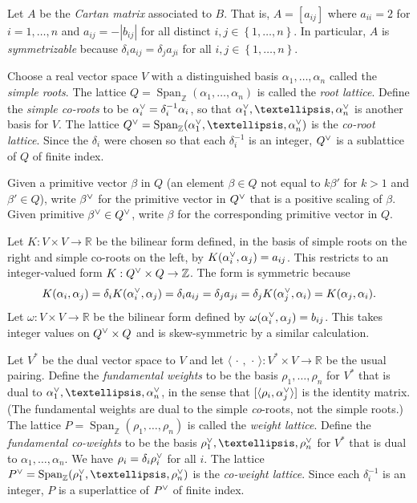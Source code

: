 \documentclass[10pt,a4paper]{amsart}
\theoremstyle{definition}
\DeclareMathOperator{\Span}{Span}
\newcommand{\newword}[1]{\emph{#1}}
\newcommand{\integers}{\mathbb Z}
\newcommand{\reals}{\mathbb R}
\newcommand{\set}[1]{{\left\lbrace #1 \right\rbrace}}
\newcommand{\br}[1]{{\langle #1 \rangle}}
\newcommand{\ck}{\spcheck}
\begin{document}
Let $A$ be the \newword{Cartan matrix} associated to $B$.
That is, $A=[a_{ij}]$ where $a_{ii}=2$ for $i=1,\ldots,n$ and $a_{ij}=-|b_{ij}|$ for all distinct $i,j\in\set{1,\ldots,n}$.
In particular, $A$ is \newword{symmetrizable} because $\delta_ia_{ij}=\delta_ja_{ji}$ for all $i,j\in\set{1,\ldots,n}$.

Choose a real vector space $V$ with a distinguished basis $\alpha_1,\ldots,\alpha_n$ called the \newword{simple roots}.
The lattice $Q=\Span_\integers(\alpha_1,\ldots,\alpha_n)$ is called the \newword{root lattice}.
Define the \newword{simple co-roots} to be $\alpha_i\ck=\delta_i^{-1}\alpha_i$, so that $\alpha_1\ck,\ldots,\alpha_n\ck$ is another basis for $V$.
The lattice $Q\ck=\Span_\integers(\alpha_1\ck,\ldots,\alpha_n\ck)$ is the \newword{co-root lattice}.
Since the $\delta_i$ were chosen so that each $\delta_i^{-1}$ is an integer, $Q\ck$ is a sublattice of $Q$ of finite index.

Given a primitive vector $\beta$ in $Q$ (an element $\beta\in Q$ not equal to $k\beta'$ for $k>1$ and $\beta'\in Q$), write $\beta\ck$ for the primitive vector in $Q\ck$ that is a positive scaling of $\beta$.
Given primitive $\beta\ck\in Q\ck$, write $\beta$ for the corresponding primitive vector in $Q$.

Let $K:V\times V\to\reals$ be the bilinear form defined, in the basis of simple roots on the right and simple co-roots on the left, by $K(\alpha_i\ck,\alpha_j)=a_{ij}$.
This restricts to an integer-valued form $K:Q\ck\times Q\to\integers$.
The form is symmetric because 
\[K(\alpha_i,\alpha_j)=\delta_iK(\alpha_i\ck,\alpha_j)=\delta_ia_{ij}=\delta_ja_{ji}=\delta_jK(\alpha_j\ck,\alpha_i)=K(\alpha_j,\alpha_i).\]
Let $\omega:V\times V\to\reals$ be the bilinear form defined by $\omega(\alpha_i\ck,\alpha_j)=b_{ij}$.
This takes integer values on $Q\ck\times Q$ and is skew-symmetric by a similar calculation.

Let $V^*$ be the dual vector space to $V$ and let $\br{\,\cdot\,,\,\cdot\,}:V^*\times V\to\reals$ be the usual pairing.
Define the \newword{fundamental weights} to be the basis $\rho_1,\ldots,\rho_n$ for $V^*$ that is dual to $\alpha_1\ck,\ldots,\alpha_n\ck$, in the sense that $[\br{\rho_i,\alpha\ck_j}]$ is the identity matrix.
(The fundamental weights are dual to the simple \emph{co}-roots, not the simple roots.)
The lattice $P=\Span_\integers(\rho_1,\ldots,\rho_n)$ is called the \newword{weight lattice}.
Define the \newword{fundamental co-weights} to be the basis $\rho_1\ck,\ldots,\rho_n\ck$ for $V^*$ that is dual to $\alpha_1,\ldots,\alpha_n$.
We have $\rho_i=\delta_i\rho_i\ck$ for all $i$.
The lattice $P\ck=\Span_\integers(\rho_1\ck,\ldots,\rho_n\ck)$ is the \newword{co-weight lattice}.
Since each $\delta_i^{-1}$ is an integer, $P$ is a superlattice of $P\ck$ of finite index.
\end{document}
